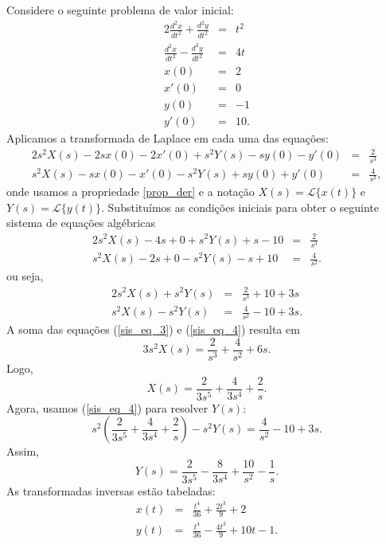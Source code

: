\begin{ex}Considere o seguinte problema de valor inicial:
\begin{eqnarray*}
2\frac{d^2x}{dt^2}+\frac{d^2y}{dt^2}&=&t^2\\
\frac{d^2x}{dt^2}-\frac{d^2y}{dt^2}&=&4t\\
x(0)&=&2\\
x'(0)&=&0\\
y(0)&=&-1\\
y'(0)&=&10.
\end{eqnarray*}
Aplicamos a transformada de Laplace em cada uma das equações:
\begin{eqnarray*}
2s^2X(s)-2sx(0)-2x'(0)+s^2Y(s)-sy(0)-y'(0)&=&\frac{2}{s^3}\\
s^2X(s)-sx(0)-x'(0)-s^2Y(s)+sy(0)+y'(0)&=&\frac{4}{s^2},
\end{eqnarray*}
onde usamos a propriedade \ref{prop_der} e a notação $X(s)=\mathcal{L}\{x(t)\}$ e $Y(s)=\mathcal{L}\{y(t)\}$. Substituímos as condições iniciais para obter o seguinte sistema de equações algébricas
\begin{eqnarray*}
2s^2X(s)-4s+0+s^2Y(s)+s-10&=&\frac{2}{s^3}\\
s^2X(s)-2s+0-s^2Y(s)-s+10&=&\frac{4}{s^2}.
\end{eqnarray*}
ou seja,
\begin{eqnarray}
\label{sis_eq_3}2s^2X(s)+s^2Y(s)&=&\frac{2}{s^3}+10+3s\\
\label{sis_eq_4} s^2X(s)-s^2Y(s)&=&\frac{4}{s^2}-10+3s.
\end{eqnarray}
A soma das equações (\ref{sis_eq_3}) e (\ref{sis_eq_4}) resulta em
\begin{equation}
3s^2X(s)=\frac{2}{s^3}+\frac{4}{s^2}+6s.
\end{equation}
Logo,
\begin{equation}
X(s)=\frac{2}{3s^5}+\frac{4}{3s^4}+\frac{2}{s}.
\end{equation}
Agora, usamos (\ref{sis_eq_4}) para resolver $Y(s)$:
\begin{equation}
s^2\left(\frac{2}{3s^5}+\frac{4}{3s^4}+\frac{2}{s}\right)-s^2Y(s)=\frac{4}{s^2}-10+3s.
\end{equation}
Assim,
\begin{equation}
Y(s)=\frac{2}{3s^5}-\frac{8}{3s^4}+\frac{10}{s^2}-\frac{1}{s}.
\end{equation}
As transformadas inversas estão tabeladas:
\begin{eqnarray*}
x(t)&=&\frac{t^4}{36}+\frac{2t^3}{9}+2\\
y(t)&=&\frac{t^4}{36}-\frac{4t^3}{9}+10t-1.
\end{eqnarray*}
\end{ex}

